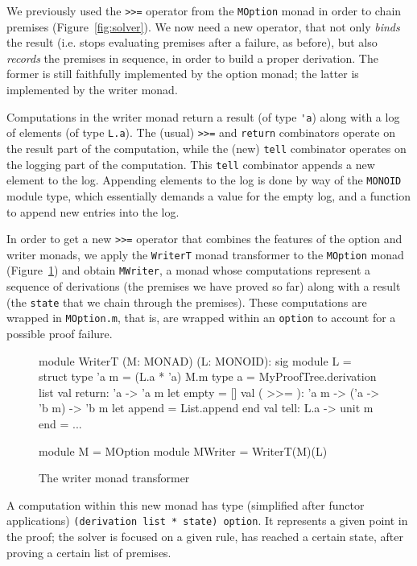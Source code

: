 \documentclass{easychair}
\def\li{\lstinline}
\newcommand{\fref}[1]{Figure~\ref{fig:#1}}
\begin{document}
We previously used the \li+>>=+ operator from the \li+MOption+ monad in order to
chain premises (\fref{solver}). We now need a new operator, that not only
\emph{binds} the result (i.e. stops evaluating premises after a failure, as
before), but also \emph{records} the premises in sequence, in order to build a
proper derivation. The former is still faithfully implemented by the option
monad; the latter is implemented by the writer monad.

Computations in the writer monad return a result (of type \li+'a+) along with a log of
elements (of type \li+L.a+). The (usual) \li+>>=+ and \li+return+ combinators operate on
the result part of the computation, while the (new) \li+tell+ combinator
operates on the logging part of the computation. This \li+tell+ combinator
appends a new element to the log. Appending elements to the log is done by way of the \li+MONOID+
module type, which essentially demands a value for the empty log, and a function to
append new entries into the log.

In order to get a new \li+>>=+ operator that combines the features of
the option and writer monads, we apply the \li+WriterT+ monad transformer to the
\li+MOption+ monad (\fref{writer}) and obtain \li+MWriter+, a monad whose
computations represent a sequence of derivations (the premises we have proved so far)
along with a result (the \li+state+ that we chain through the premises). These
computations are wrapped in \li+MOption.m+, that is, are wrapped within an
\li+option+ to account for a possible proof failure.

\begin{figure}
  \centering
\begin{ocaml}
module WriterT (M: MONAD) (L: MONOID): sig      module L = struct
  type 'a m = (L.a * 'a) M.m                      type a = MyProofTree.derivation list
  val return: 'a -> 'a m                          let empty = []
  val ( >>= ): 'a m -> ('a -> 'b m) -> 'b m       let append = List.append
                                                end
  val tell: L.a -> unit m
end = ...

module M = MOption
module MWriter = WriterT(M)(L)
\end{ocaml}
  \caption{The writer monad transformer}
  \label{fig:writer}
\end{figure}

A computation within this new monad has type (simplified after functor applications)
\li+(derivation list * state) option+. It represents a given point in the proof;
the solver is focused on a given rule, has reached a certain state, after
proving a certain list of premises.
\end{document}
